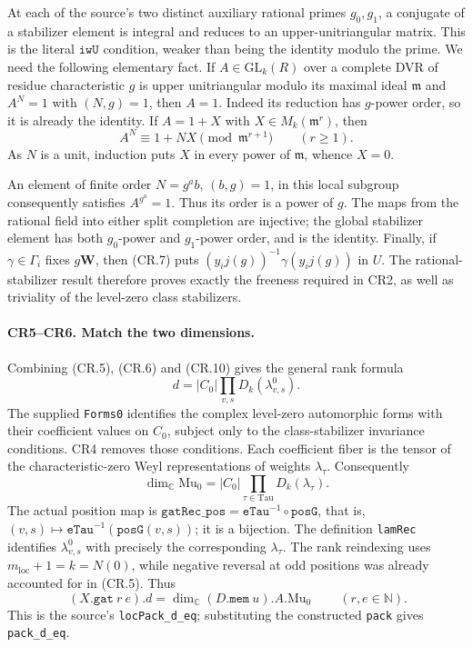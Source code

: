 At each of the source's two distinct auxiliary rational primes
$g_0,g_1$, a conjugate of a stabilizer element is integral and reduces
to an upper-unitriangular matrix. This is the literal
$\texttt{iwU}$ condition, weaker than being the identity modulo the
prime. We need the following elementary fact. If $A\in\mathrm{GL}_k(R)$
over a complete DVR of residue characteristic $g$ is upper
unitriangular modulo its maximal ideal $\mathfrak m$ and
$A^N=1$ with $(N,g)=1$, then $A=1$. Indeed its reduction has
$g$-power order, so it is already the identity. If
$A=1+X$ with $X\in M_k(\mathfrak m^r)$, then
\[
 A^N\equiv1+NX\pmod{\mathfrak m^{r+1}}
       \qquad(r\ge1).
\]
As $N$ is a unit, induction puts $X$ in every power of
$\mathfrak m$, whence $X=0$.

An element of finite order $N=g^a b$, $(b,g)=1$, in this local
subgroup consequently satisfies $A^{g^a}=1$. Thus its order is a
power of $g$. The maps from the rational field into either split
completion are injective; the global stabilizer element has both
$g_0$-power and $g_1$-power order, and is the identity.
Finally, if $\gamma\in\Gamma_i$ fixes $g\mathbf W$, then (CR.7)
puts $(y_i j(g))^{-1}\gamma(y_i j(g))$ in $U$.
The rational-stabilizer result therefore proves exactly the freeness
required in CR2, as well as triviality of the level-zero class
stabilizers.

\paragraph{CR5--CR6. Match the two dimensions.}
Combining (CR.5), (CR.6) and (CR.10) gives the general rank formula
\[
 \boxed{\ d=|C_0|\prod_{v,s}D_k(\lambda^0_{v,s}).\ }      \tag{CR.11}
\]
The supplied \texttt{Forms0} identifies the complex level-zero
automorphic forms with their coefficient values on $C_0$, subject
only to the class-stabilizer invariance conditions. CR4 removes
those conditions. Each coefficient fiber is the tensor of the
characteristic-zero Weyl representations of weights $\lambda_\tau$.
Consequently
\[
 \dim_{\mathbb C}\mathrm{Mu}_0
       =|C_0|\prod_{\tau\in\mathrm{Tau}}D_k(\lambda_\tau).
                                                               \tag{CR.12}
\]
The actual position map is
$\texttt{gatRec\_pos}=\texttt{eTau}^{-1}\circ\texttt{posG}$,
that is, $(v,s)\mapsto\texttt{eTau}^{-1}(\texttt{posG}(v,s))$;
it is a bijection. The definition \texttt{lamRec} identifies
$\lambda^0_{v,s}$ with precisely the corresponding $\lambda_\tau$.
The rank reindexing uses $m_{\mathrm{loc}}+1=k=N(0)$, while negative reversal at
odd positions was already accounted for in (CR.5). Thus
\[
 \boxed{\ (X.\texttt{gat}\ r\ e).d
          =\dim_{\mathbb C}(D.\texttt{mem}\ u).A.\mathrm{Mu}_0\ }
             \qquad(r,e\in\mathbb N).                    \tag{CR.13}
\]
This is the source's \texttt{locPack\_d\_eq}; substituting the
constructed \texttt{pack} gives \texttt{pack\_d\_eq}.

